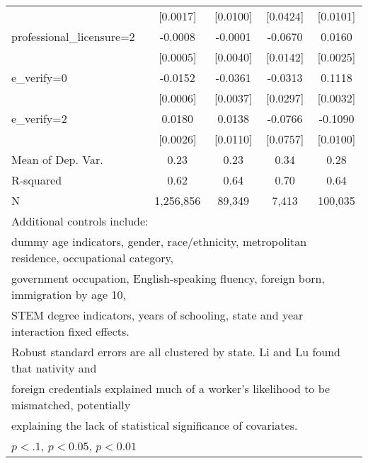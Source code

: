 \begin{table}[htbp]
\begin{tabular}{l*{4}{c}}
                    &    [0.0017]         &    [0.0100]         &    [0.0424]         &    [0.0101]         \\
\addlinespace
professional\_licensure=2&     -0.0008         &     -0.0001         &     -0.0670\sym{***}&      0.0160\sym{***}\\
                    &    [0.0005]         &    [0.0040]         &    [0.0142]         &    [0.0025]         \\
\addlinespace
e\_verify=0          &     -0.0152\sym{***}&     -0.0361\sym{***}&     -0.0313         &      0.1118\sym{***}\\
                    &    [0.0006]         &    [0.0037]         &    [0.0297]         &    [0.0032]         \\
\addlinespace
e\_verify=2          &      0.0180\sym{***}&      0.0138         &     -0.0766         &     -0.1090\sym{***}\\
                    &    [0.0026]         &    [0.0110]         &    [0.0757]         &    [0.0100]         \\
\midrule
Mean of Dep. Var.   &        0.23         &        0.23         &        0.34         &        0.28         \\
R-squared           &        0.62         &        0.64         &        0.70         &        0.64         \\
N                   &   1,256,856         &      89,349         &       7,413         &     100,035         \\
\bottomrule
\multicolumn{5}{l}{\footnotesize Additional controls include:}\\
\multicolumn{5}{l}{\footnotesize dummy age indicators, gender, race/ethnicity, metropolitan residence, occupational category,}\\
\multicolumn{5}{l}{\footnotesize government occupation, English-speaking fluency, foreign born, immigration by age 10,}\\
\multicolumn{5}{l}{\footnotesize STEM degree indicators, years of schooling, state and year interaction fixed effects.}\\
\multicolumn{5}{l}{\footnotesize Robust standard errors are all clustered by state. Li and Lu found that nativity and}\\
\multicolumn{5}{l}{\footnotesize foreign credentials explained much of a worker's likelihood to be mismatched, potentially}\\
\multicolumn{5}{l}{\footnotesize explaining the lack of statistical significance of covariates.}\\
\multicolumn{5}{l}{\footnotesize \sym{*} \(p<.1\), \sym{**} \(p<0.05\), \sym{***} \(p<0.01\)}\\
\end{tabular}
\end{table}
